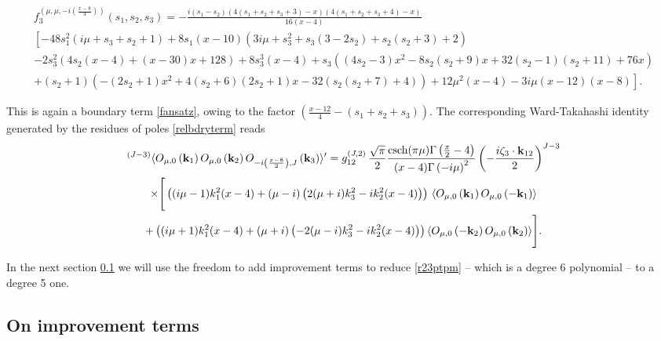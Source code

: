 \documentclass[11pt,a4paper]{article}
\begin{document}
{\footnotesize\begin{multline}\label{r23ptpm}
  f^{\left(\mu,\mu,-i\left(\frac{x-8}{4}\right)\right)}_3(s_1,s_2,s_3)= -\frac{i (s_1-s_2) (4 (s_1+s_2+s_3+3)-x) (4 (s_1+s_2+s_3+4)-x)}{16 (x-4)} \\ \left[-48 s^2_1 (i \mu +s_3+s_2+1)+8 s_1 (x-10) \left(3 i \mu +s^2_3+s_3 (3-2 s_2)+s_2 (s_2+3)+2\right)\right.\\\left.-2 s^2_3 (4 s_2 (x-4)+(x-30) x+128)+8 s^3_3 (x-4)+s_3 \left((4 s_2-3) x^2-8 s_2 (s_2+9) x+32 (s_2-1) (s_2+11)+76 x\right)\right.\\\left.+(s_2+1) \left(-(2 s_2+1) x^2+4 (s_2+6) (2 s_2+1) x-32 (s_2 (s_2+7)+4)\right)+12 \mu ^2 (x-4)-3 i \mu  (x-12) (x-8)\right].
\end{multline}}

\noindent This is again a boundary term \eqref{fansatz}, owing to the factor $(\frac{x-12}{4}-(s_1+s_2+s_3))$. The corresponding Ward-Takahashi identity generated by the residues of poles \eqref{relbdryterm} reads
\begin{multline}\label{pmdep2ward}
   {}^{\left(J-3\right)}\langle O_{\mu,0}\left({\bf k}_1\right)O_{\mu,0}\left({\bf k}_2\right)O_{-i\left(\frac{x-8}{2}\right),J}\left({\bf k}_3\right)  \rangle^\prime= g^{\left(J,2\right)}_{12}\,\frac{\sqrt{\pi}}{2}\frac{\text{csch}(\pi  \mu ) \Gamma \left(\frac{x}{2}-4\right)}{ (x-4)\Gamma\left(-i\mu\right)^2}\left(-\frac{i\zeta_3 \cdot {\bf k}_{12}}{2}\right)^{J-3}\\\times \Bigg[\left((i\mu -1) k^2_1 (x-4)+(\mu -i) \left(2 (\mu +i) k^2_3-i k^2_2 (x-4)\right)\right)\,\langle O_{\mu,0}\left({\bf k}_1\right)O_{\mu,0}\left(-{\bf k}_1\right)\rangle\\
    +\left((i \mu+1 ) k^2_1 (x-4)+(\mu +i ) \left(-2 (\mu -i) k^2_3-ik^2_2 (x-4)\right)\right)\langle O_{\mu,0}\left(-{\bf k}_2\right)O_{\mu,0}\left({\bf k}_2\right)\rangle\Bigg].
\end{multline}

\noindent In the next section \ref{subsec::3ptimp} we will use the freedom to add improvement terms to reduce \eqref{r23ptpm} -- which is a degree 6 polynomial -- to a degree 5 one.



\subsection{On improvement terms}
\label{subsec::3ptimp}
\end{document}
